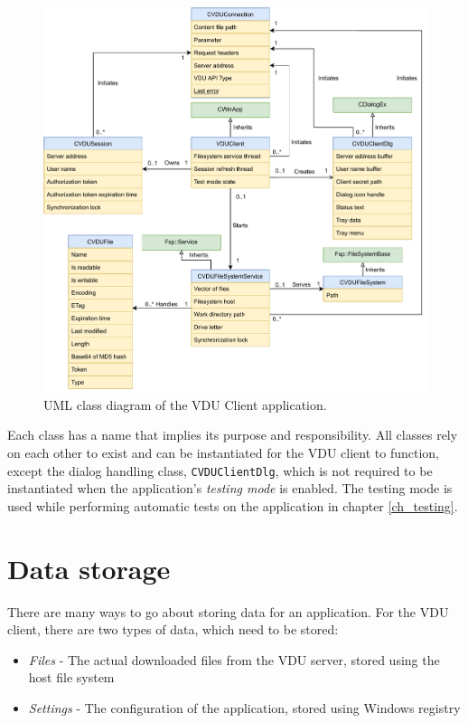 \begin{figure}[htb]
    \centering
	\includegraphics[width=\columnwidth]{obrazky-figures/vduclassdiagram.pdf}
	\caption{UML class diagram of the VDU Client application. }
	\label{vduclassdiagram}
\end{figure}
Each class has a name that implies its purpose and responsibility. All classes rely on each other to exist and can be instantiated for the VDU client to function, except the dialog handling class, \lstinline{CVDUClientDlg}, which is not required to be instantiated when the application's \textit{testing mode} is enabled. The testing mode is used while performing automatic tests on the application in chapter \ref{ch_testing}.

\section{Data storage}
There are many ways to go about storing data for an application. For the VDU client, there are two types of data, which need to be stored:
\begin{itemize}
    \item \textit{Files} - The actual downloaded files from the VDU server, stored using the host file system
    \item \textit{Settings} - The configuration of the application, stored using Windows registry
\end{itemize}

